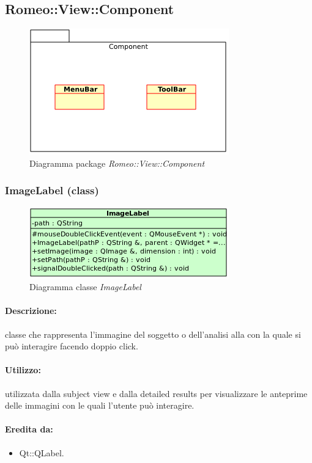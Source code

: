 \subsection{Romeo::View::Component}
	\begin{figure} [!h]
		\centering
		\includegraphics[scale=0.5] {./Content/Immagini/Romeo__View__Component.png}
		\caption{Diagramma package \textsl{Romeo::View::Component}}
	\end{figure}
	\subsubsection{ImageLabel (class)}
	\begin{figure}[!h]
		\centering
		\includegraphics[scale=2.75]{./Content/Immagini/view/ImageLabel}
		\caption{Diagramma classe \textsl{ImageLabel}}
	\end{figure}
	\paragraph{Descrizione:} classe che rappresenta l'immagine del soggetto o dell'analisi alla con la quale si può interagire facendo doppio click.
	\paragraph{Utilizzo:} utilizzata dalla subject view e dalla detailed results per visualizzare le anteprime delle immagini con le quali l'utente può interagire.
	\paragraph{Eredita da:}
		\begin{itemize}
			\item Qt::QLabel.
		\end{itemize}
